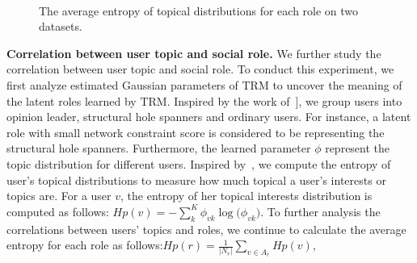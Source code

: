 \documentclass[runningheads,a4paper]{llncs}
\begin{document}
\begin{figure}[ht]
\centering
{}
\hspace{5mm}
\hfil
{}
\hfil
\\
\caption{The average entropy of topical distributions for each role on two datasets.}\label{fig:4}
\end{figure}
\noindent\textbf{Correlation between user topic and social role.}
We further study the correlation between user topic and social role. To conduct this experiment, we first analyze estimated Gaussian parameters of TRM to uncover the meaning of the latent roles learned by TRM. Inspired by the work of~\cite{page1999pagerank,burt2009structural,Zhang2014Role,yang2015rain}], we group users into opinion leader, structural hole spanners and ordinary users. For instance, a latent role with small network constraint score is considered to be representing the structural hole spanners. Furthermore, the learned parameter $\phi$ represent the topic distribution for different users. Inspired by~\cite{Grabowicz2016Distinguishing}, we compute the entropy of user's topical distributions to measure how much topical a user's interests or topics are.
For a user $v$, the entropy of her topical interests distribution is computed as follows: $Hp(v) =  - \sum\limits_k^K {{\phi _{vk}}\log (} {\phi _{vk}})$.
To further analysis the correlations between users' topics and roles, we continue to calculate the average entropy for each role as follows:$Hp(r) =  \frac{1}{{\left| {{N_r}} \right|}}\sum\limits_{v \in {A_r}}^{} {Hp(v)}$,
\end{document}
